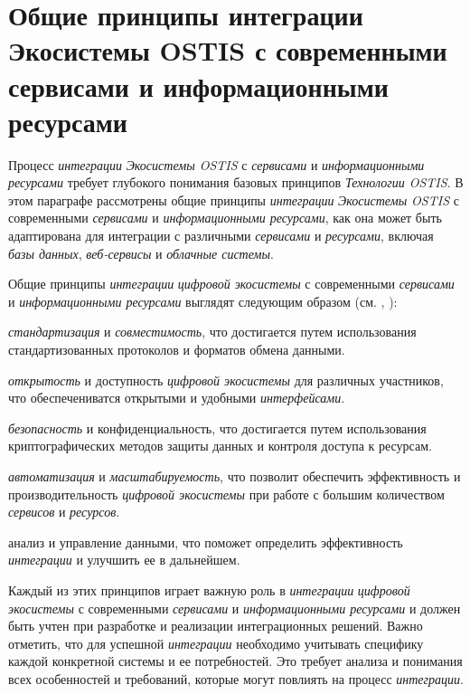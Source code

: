 \section{Общие принципы интеграции Экосистемы OSTIS с современными сервисами и информационными ресурсами}
{\label{sec_integration_common_principles}}

Процесс \textit{интеграции} \textit{Экосистемы OSTIS} с \textit{сервисами} и \textit{информационными ресурсами} требует глубокого понимания базовых принципов \textit{Технологии OSTIS}. 
В этом параграфе рассмотрены общие принципы \textit{интеграции} \textit{Экосистемы OSTIS} с современными \textit{сервисами} и \textit{информационными ресурсами}, как она может быть адаптирована для интеграции с различными \textit{сервисами} и \textit{ресурсами}, включая \textit{базы данных}, \textit{веб-сервисы} и \textit{облачные системы}.

Общие принципы \textit{интеграции} \textit{цифровой экосистемы} с современными \textit{сервисами} и \textit{информационными ресурсами} выглядят следующим образом (см. , ):
\begin{textitemize}
    \item \textit{стандартизация} и \textit{совместимость}, что достигается путем использования стандартизованных протоколов и форматов обмена данными.
    \item \textit{открытость} и доступность \textit{цифровой экосистемы} для различных участников, что обеспечениватся открытыми и удобными \textit{интерфейсами}.
    \item \textit{безопасность} и конфиденциальность, что достигается путем использования криптографических методов защиты данных и контроля доступа к ресурсам.
    \item \textit{автоматизация} и \textit{масштабируемость}, что позволит обеспечить эффективность и производительность \textit{цифровой экосистемы} при работе с большим количеством \textit{сервисов} и \textit{ресурсов}.
    \item анализ и управление данными, что поможет определить эффективность \textit{интеграции} и улучшить ее в дальнейшем.
\end{textitemize}

Каждый из этих принципов играет важную роль в \textit{интеграции} \textit{цифровой экосистемы} с современными \textit{сервисами} и \textit{информационными ресурсами} и должен быть учтен при разработке и реализации интеграционных решений. Важно отметить, что для успешной \textit{интеграции} необходимо учитывать специфику каждой конкретной системы и ее потребностей. Это требует анализа и понимания всех особенностей и требований, которые могут повлиять на процесс \textit{интеграции}.

